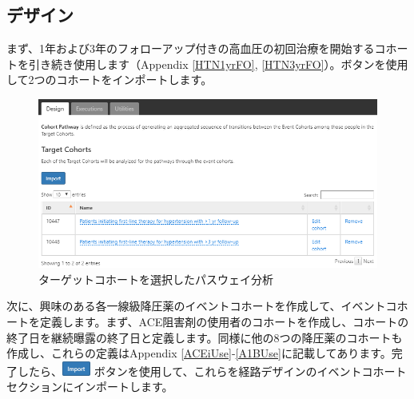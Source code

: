 \documentclass[
  11pt]{book}
\theoremstyle{definition}
\theoremstyle{definition}
\theoremstyle{definition}
\theoremstyle{definition}
\theoremstyle{remark}
\begin{document}
\subsection{デザイン}\label{ux30c7ux30b6ux30a4ux30f3-1}

まず、1年および3年のフォローアップ付きの高血圧の初回治療を開始するコホートを引き続き使用します（Appendix \ref{HTN1yrFO}, \ref{HTN3yrFO}）。ボタンを使用して2つのコホートをインポートします。

\begin{figure}

{\centering \includegraphics[width=1\linewidth]{images/Characterization/atlasPathwaysTargetCohorts} 

}

\caption{ターゲットコホートを選択したパスウェイ分析}\label{fig:atlasPathwaysTargetCohorts}
\end{figure}

次に、興味のある各一線級降圧薬のイベントコホートを作成して、イベントコホートを定義します。まず、ACE阻害剤の使用者のコホートを作成し、コホートの終了日を継続曝露の終了日と定義します。同様に他の8つの降圧薬のコホートも作成し、これらの定義はAppendix \ref{ACEiUse}-\ref{A1BUse}に記載してあります。完了したら、\includegraphics{images/Characterization/atlasImportButton.png} ボタンを使用して、これらを経路デザインのイベントコホートセクションにインポートします。
\end{document}
